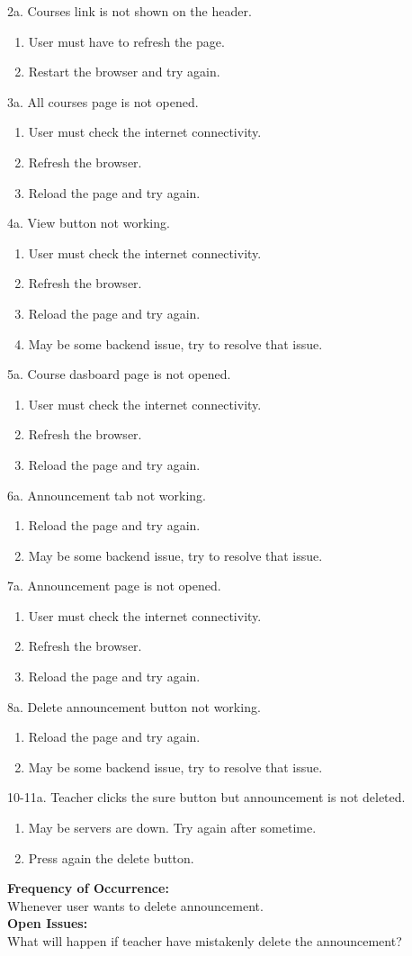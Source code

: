 2a. Courses link is not shown on the header.
\begin{enumerate}
\item User must have to refresh the page.
\item Restart the browser and try again.
\end{enumerate} 
3a. All courses page is not opened.
\begin{enumerate}
\item User must check the internet connectivity.
\item Refresh the browser.
\item Reload the page and try again.
\end{enumerate}
4a. View button not working.
\begin{enumerate}
\item User must check the internet connectivity.
\item Refresh the browser.
\item Reload the page and try again.
\item May be some backend issue, try to resolve that issue.
\end{enumerate}
5a. Course dasboard page is not opened.
\begin{enumerate}
\item User must check the internet connectivity.
\item Refresh the browser.
\item Reload the page and try again.
\end{enumerate}
6a. Announcement tab not working.
\begin{enumerate}
\item Reload the page and try again.
\item May be some backend issue, try to resolve that issue.
\end{enumerate}
7a. Announcement page is not opened.
\begin{enumerate}
\item User must check the internet connectivity.
\item Refresh the browser.
\item Reload the page and try again.
\end{enumerate}
8a. Delete announcement button not working.
\begin{enumerate}
\item Reload the page and try again.
\item May be some backend issue, try to resolve that issue.
\end{enumerate}
10-11a. Teacher clicks the sure button but announcement is not deleted.
\begin{enumerate}
\item May be servers are down. Try again after sometime.
\item Press again the delete button.
\end{enumerate}
\textbf{Frequency of Occurrence:}\\
Whenever user wants to delete announcement.\\
\textbf{Open Issues:}\\
What will happen if teacher have mistakenly delete the announcement?



